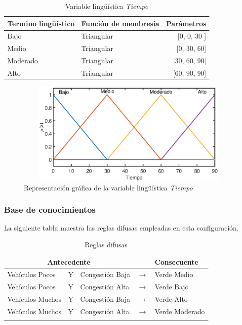 \begin{table}[!h]
	\centering
	\begin{tabular}{llr} \toprule
		Termino lingüístico & Función de membresía & Parámetros \\ \midrule
		Bajo & Triangular & [0, 0, 30 ] \\
		Medio & Triangular & [0, 30, 60] \\
		Moderado & Triangular & [30, 60, 90] \\
		Alto & Triangular & [60, 90, 90] \\ \bottomrule
	\end{tabular}
	\caption[Variable lingüística \textit{Tiempo} (configuración \textit{A})]{Variable lingüística \textit{Tiempo}}
\end{table}

\begin{figure}[H]
	\centering
	\includegraphics[height=5cm, width=12cm]{Variables/ConfigA_output1.eps}
	\caption[Representación gráfica de la variable lingüística \textit{Tiempo} (configuración \textit{A})]{Representación gráfica de la variable lingüística \textit{Tiempo}}
\end{figure}

\subsubsection{Base de conocimientos}
La siguiente tabla muestra las reglas difusas empleadas en esta configuración.
\begin{longtable}[c]{lclcl} \toprule
	\multicolumn{3}{c}{Antecedente} & & Consecuente \\ \midrule
	Vehículos Pocos & Y & Congestión Baja& $\rightarrow$ & Verde Medio \\
	Vehículos Pocos & Y & Congestión Alta& $\rightarrow$ & Verde Bajo \\
	Vehículos Muchos &Y& Congestión Baja& $\rightarrow$ & Verde Alto \\
	Vehículos Muchos &Y& Congestión Alta& $\rightarrow$ & Verde Moderado \\ \hline
	\caption[Reglas difusas (configuración \textit{A})]{Reglas difusas}
\end{longtable}

